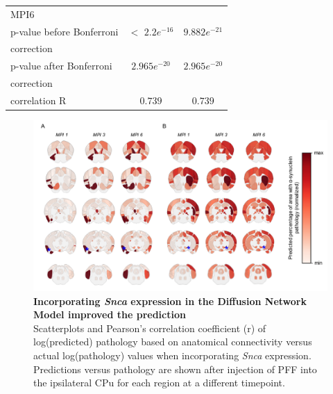 \begin{table}[ht]
\begin{center}
\begin{tabular}{|l|c|c|}
      MPI6& &\\
            \hspace{1cm} p-value before Bonferroni & $<$ $2.2e^{-16}$ & $9.882e^{-21}$ \\ 
            \hspace{1cm} correction & &\\
            \hspace{1cm} p-value after Bonferroni & $2.965e^{-20}$ & $2.965e^{-20}$  \\ 
            \hspace{1cm} correction & &\\
            \hspace{1cm} correlation R & $0.739$ & $0.739$ \\
      \hline

      
    \end{tabular}
  \end{center}
\end{table}

\begin{figure}
    \includegraphics[width=\linewidth]{Figures/Fig3.pdf}
    \centering
    \caption{\textbf{Incorporating \textit{Snca} expression in the Diffusion Network Model improved the prediction} \\
    Scatterplots and Pearson's correlation coefficient (r) of log(predicted) pathology based on anatomical connectivity versus actual log(pathology) values when incorporating \textit{Snca} expression. Predictions versus pathology are shown after injection of PFF into the ipsilateral CPu for each region at a different timepoint.}
    \label{fig:fig3}

    \end{figure}

